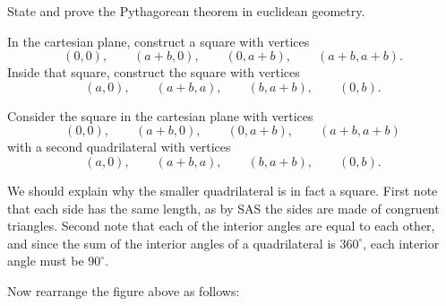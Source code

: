 \documentclass[newpage,hints,handout]{ximera}
\begin{document}
\begin{problem}
State and prove the Pythagorean theorem in euclidean geometry.

\begin{hint}
In the cartesian plane, construct a square with vertices
\[
\left(0,0\right),\qquad \left(a+b,0\right),\qquad \left(0,a+b\right), \qquad \left( a+b,a+b\right).
\] 
Inside that square, construct the square with vertices 
\[
\left(a,0\right),\qquad \left(a+b,a\right),\qquad \left(b,a+b\right), \qquad \left(0,b\right).
\]
\end{hint}
\begin{freeResponse}
Consider the square in the cartesian plane with vertices
\[
\left(0,0\right),\qquad \left(a+b,0\right),\qquad \left(0,a+b\right),
\qquad \left( a+b,a+b\right)
\]
with a second quadrilateral with vertices
\[
\left(a,0\right),\qquad \left(a+b,a\right),\qquad \left(b,a+b\right), \qquad \left(0,b\right).
\]
\begin{image}
\end{image}
We should explain why the smaller quadrilateral is in fact a
square. First note that each side has the same length, as by SAS the
sides are made of congruent triangles. Second note that each of the
interior angles are equal to each other, and since the sum of the
interior angles of a quadrilateral is $360^\circ$, each interior angle
must be $90^\circ$.

Now rearrange the figure above as follows:
\begin{image}
\end{image}
\end{freeResponse}
\end{problem}
\end{document}
